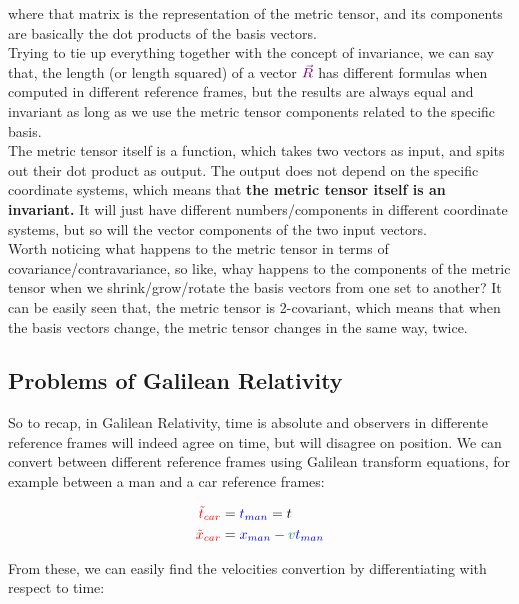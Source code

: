 where that matrix is the representation of the metric tensor, and its components are basically the 
dot products of the basis vectors.\\

Trying to tie up everything together with the concept of invariance, we can say that, the length (or length squared) of a vector 
$\color{violet}\vec{R}$ has different formulas when computed in different reference frames, but the results are always equal and invariant 
as long as we use the metric tensor components related to the specific basis.\\

The metric tensor itself is a function, which takes two vectors as input, and spits out their dot product as output.
The output does not depend on the specific coordinate systems, which means that \textbf{the metric tensor itself is an invariant.}
It will just have different numbers/components in different coordinate systems, but so will the vector components of the two input vectors.\\

Worth noticing what happens to the metric tensor in terms of covariance/contravariance, so like, 
whay happens to the components of the metric tensor when we shrink/grow/rotate the basis vectors from one set to another?
It can be easily seen that, the metric tensor is 2-covariant, which means that when the basis vectors change, the metric tensor
changes in the same way, twice.

\subsection{Problems of Galilean Relativity}

So to recap, in Galilean Relativity, time is absolute and observers in differente reference frames will indeed agree on time, but will disagree on position.
We can convert between different reference frames using Galilean transform equations, for example between a man and a car reference frames:

\begin{align*}
    \begingroup\color{red}\tilde{t}_{car}\endgroup &= \begingroup\color{blue}t_{man}\endgroup = t\\
    \begingroup\color{red}\tilde{x}_{car}\endgroup &= \begingroup\color{blue}x_{man}\endgroup - \begingroup\color{teal}v\endgroup \begingroup\color{blue}t_{man}\endgroup
\end{align*}

From these, we can easily find the velocities convertion by differentiating with respect to time:

